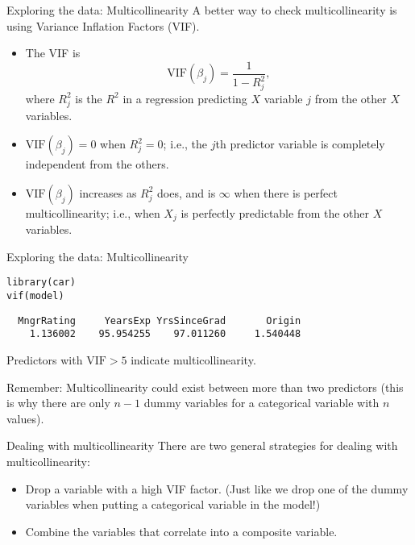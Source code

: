 \documentclass{beamer}\usepackage[]{graphicx}\usepackage[]{color}
\makeatletter
\newcommand{\hlstd}[1]{\textcolor[rgb]{1,0.894,0.769}{#1}}%
\newcommand{\hlkwd}[1]{\textcolor[rgb]{1,0.78,0.769}{#1}}%
\newenvironment{kframe}{%
 \def\at@end@of@kframe{}%
 \ifinner\ifhmode%
  \def\at@end@of@kframe{\end{minipage}}%
  \begin{minipage}{\columnwidth}%
 \fi\fi%
 \def\FrameCommand##1{\hskip\@totalleftmargin \hskip-\fboxsep
 \colorbox{shadecolor}{##1}\hskip-\fboxsep
     \hskip-\linewidth \hskip-\@totalleftmargin \hskip\columnwidth}%
 \MakeFramed {\advance\hsize-\width
   \@totalleftmargin\z@ \linewidth\hsize
   \@setminipage}}%
 {\par\unskip\endMakeFramed%
 \at@end@of@kframe}
\newenvironment{knitrout}{}{} %
\makeatother
\begin{document}
\begin{darkframes}
    \begin{frame}[fragile]{Exploring the data: Multicollinearity}
      A better way to check multicollinearity is using Variance Inflation Factors (VIF).

      \begin{itemize}[<+->]
        \item The VIF is
          \[
            \text{VIF}(\beta_j) = \frac{1}{1 - R_j^2},
          \]
          where $R_j^2$ is the $R^2$ in a regression predicting $X$ variable $j$ from the other $X$ variables.
        \item $\text{VIF}(\beta_j)=0$ when $R_j^2=0$; i.e., the $j$th predictor variable is completely independent from the others.
        \item $\text{VIF}(\beta_j)$ increases as $R_j^2$ does, and is $\infty$ when there is perfect multicollinearity; i.e., when $X_j$ is perfectly predictable from the other $X$ variables.
      \end{itemize}
    \end{frame}

    \begin{frame}[fragile]{Exploring the data: Multicollinearity}
\begin{knitrout}
\begin{kframe}
\begin{alltt}
\hlkwd{library}\hlstd{(car)}
\hlkwd{vif}\hlstd{(model)}
\end{alltt}
\begin{verbatim}
  MngrRating     YearsExp YrsSinceGrad       Origin 
    1.136002    95.954255    97.011260     1.540448 
\end{verbatim}
\end{kframe}
\end{knitrout}
      Predictors with $\text{VIF} > 5$ indicate multicollinearity.
      \pause\bigskip

      \alert{Remember:} Multicollinearity could exist between more than two predictors (this is why there are only $n-1$ dummy variables for a categorical variable with $n$ values).
    \end{frame}

    \begin{frame}
    \end{frame}

    \begin{frame}{Dealing with multicollinearity}
      There are two general strategies for dealing with multicollinearity:
      \begin{itemize}
        \item Drop a variable with a high VIF factor. (Just like we drop one of the dummy variables when putting a categorical variable in the model!)
        \item Combine the variables that correlate into a composite variable.
      \end{itemize}
    \end{frame}


\end{darkframes}
\end{document}
